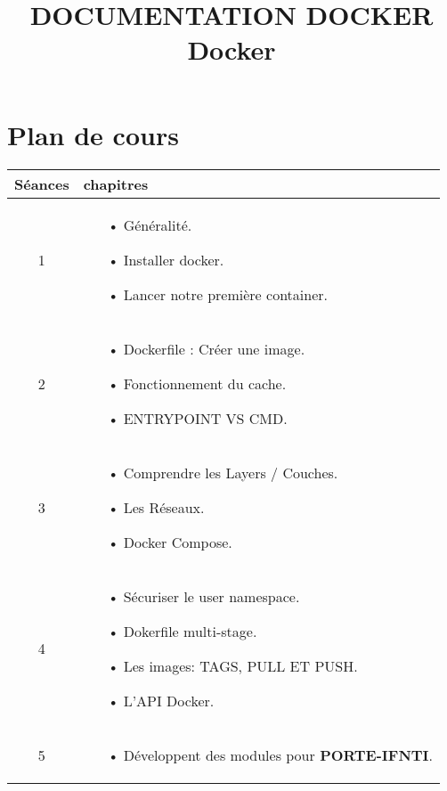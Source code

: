 \documentclass[12pt,a4paper]{article}
\title{DOCUMENTATION DOCKER \textbf{Docker}}
\begin{document}
\maketitle
\section{Plan de cours}

\begin{tabular}{|c|p{12cm}|}
\hline 
Séances & chapitres \\ 
\hline 
1 & \begin{itemize}
\item[•] Généralité.
\item[•] Installer docker.
\item[•] Lancer notre première container.
\end{itemize} \\ 
\hline 
2 & \begin{itemize}
\item[•] Dockerfile : Créer une image.
\item[•] Fonctionnement du cache.
\item[•] ENTRYPOINT VS CMD.
\end{itemize} \\ 
\hline 
3 & \begin{itemize}
\item[•] Comprendre les Layers / Couches.
\item[•] Les Réseaux.
\item[•] Docker Compose.
\end{itemize} \\ 
\hline 
4 & \begin{itemize}
\item[•] Sécuriser le user namespace.
\item[•] Dokerfile multi-stage.
\item[•] Les images: TAGS, PULL ET PUSH.
\item[•] L'API Docker.
\end{itemize} \\ 
\hline 
5 & \begin{itemize}
\item[•] Développent des modules pour \textbf{PORTE-IFNTI}.
\end{itemize} \\ 
\hline 
\end{tabular} 
\end{document}
